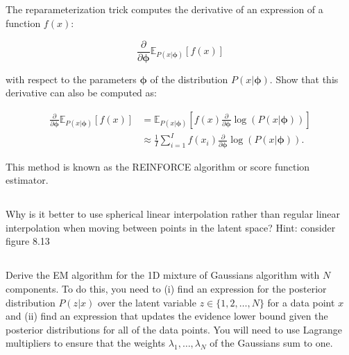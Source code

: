 \documentclass[12pt]{report}
\begin{document}
\subsection{}
\begin{mdframed}
    The reparameterization trick computes the derivative of an expression of a function $f(x)$:

    \begin{equation*}
        \frac{\partial}{\partial \boldsymbol{\phi}}\mathbb{E}_{P(x|\boldsymbol{\phi})}[f(x)]
    \end{equation*}

    with respect to the parameters $\boldsymbol{\phi}$ of the distribution $P(x|\boldsymbol{\phi})$. Show that this derivative can also be computed as:

    \begin{align*}
        \frac{\partial}{\partial \boldsymbol{\phi}}\mathbb{E}_{P(x|\boldsymbol{\phi})}[f(x)] & = \mathbb{E}_{P(x|\boldsymbol{\phi})} \left[ f(x) \frac{\partial}{\partial \boldsymbol{\phi}} \log(P(x|\boldsymbol{\phi})) \right] \\
                                                                                             & \approx \frac{1}{I} \sum_{i=1}^{I} f(x_{i})\frac{\partial}{\partial \boldsymbol{\phi}} \log(P(x|\boldsymbol{\phi})).
    \end{align*}

    This method is known as the REINFORCE algorithm or score function estimator.
\end{mdframed}

\subsection{}
\begin{mdframed}
    Why is it better to use spherical linear interpolation rather than regular linear interpolation when moving between points in the latent space? Hint: consider figure 8.13
\end{mdframed}

\subsection{}
\begin{mdframed}
    Derive the EM algorithm for the 1D mixture of Gaussians algorithm with $N$ components. To do this, you need to (i) find an expression for the posterior distribution $P(z|x)$ over the latent variable $z \in \{1, 2, \dots , N\}$ for a data point $x$ and (ii) find an expression that updates the evidence lower bound given the posterior distributions for all of the data points. You will need to use Lagrange multipliers to ensure that the weights $\lambda_{1}, \dots, \lambda_{N}$ of the Gaussians sum to one.
\end{mdframed}
\end{document}
